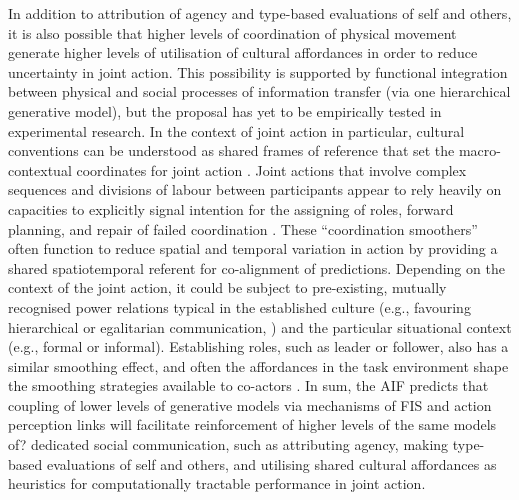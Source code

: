 \begin{CJK}{UTF8}{gbsn}
In addition to attribution of agency and type-based evaluations of self and others, it is also possible that higher levels of coordination of physical movement generate higher levels of utilisation of cultural affordances in order to reduce uncertainty in joint action.  This possibility is supported by functional integration between physical and social processes of information transfer (via one hierarchical generative model), but the proposal has yet to be empirically tested in experimental research.  In the context of joint action in particular, cultural conventions can be understood as shared frames of reference that set the macro-contextual coordinates for joint action \citep{Clark2013}.  Joint actions that involve complex sequences and divisions of labour between participants appear to rely heavily on capacities to explicitly signal intention for the assigning of roles, forward planning, and repair of failed coordination \citep{Frith2010}. These ``coordination smoothers'' \citep{Vesper2017} often function to reduce spatial and temporal variation in action by providing a shared spatiotemporal referent for co-alignment of predictions.  Depending on the context of the joint action, it could be subject to pre-existing, mutually recognised power relations typical in the established culture (e.g., favouring hierarchical or egalitarian communication, \citep[see]{Cheon2011}) and the particular situational context (e.g., formal or informal).  Establishing roles, such as leader or follower, also has a similar smoothing effect, and often the affordances in the task environment shape the smoothing strategies available to co-actors \citep{Marsh2009}.  In sum, the AIF predicts that coupling of lower levels of generative models via mechanisms of FIS and action perception links will facilitate reinforcement of higher levels of the same models of? dedicated social communication, such as attributing agency, making type-based evaluations of self and others, and utilising shared cultural affordances as heuristics for computationally tractable performance in joint action.


\end{CJK}
